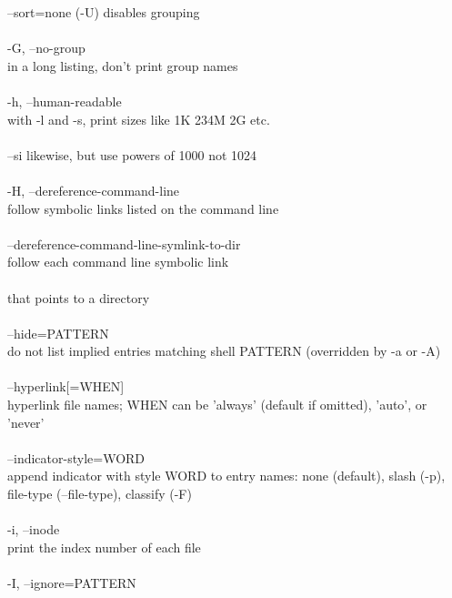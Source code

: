 \documentclass{article}
\begin{document}
\tabto{2cm}              --sort=none (-U) disables grouping \\
\\
\tabto{1cm}       -G, --no-group \\
\tabto{2cm}              in a long listing, don't print group names \\
\\
\tabto{1cm}      -h, --human-readable \\
\tabto{2cm}              with -l and -s, print sizes like 1K 234M 2G etc. \\
\\
\tabto{1cm}       --si   likewise, but use powers of 1000 not 1024 \\
\\
\tabto{1cm}       -H, --dereference-command-line \\
\tabto{2cm}              follow symbolic links listed on the command line \\
\\
\tabto{1cm}       --dereference-command-line-symlink-to-dir \\
\tabto{2cm}              follow each command line symbolic link \\
\\
\tabto{2cm}              that points to a directory \\
\\
\tabto{1cm}       --hide=PATTERN \\
\tabto{2cm}              do not list implied entries matching shell  PATTERN  (overridden
\tabto{2cm}              by -a or -A) \\
\\
\tabto{1cm}       --hyperlink[=WHEN] \\
\tabto{2cm}              hyperlink file names; WHEN can be 'always' (default if omitted),
\tabto{2cm}              'auto', or 'never' \\
\\
\tabto{1cm}       --indicator-style=WORD \\
\tabto{2cm}              append indicator with style WORD to entry names: none (default),
\tabto{2cm}              slash (-p), file-type (--file-type), classify (-F) \\
\\
\tabto{1cm}       -i, --inode \\
\tabto{2cm}              print the index number of each file \\
\\
\tabto{1cm}       -I, --ignore=PATTERN \\
\end{document}

